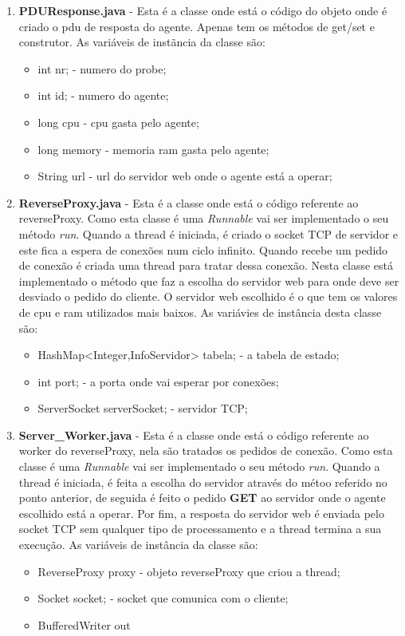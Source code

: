 \documentclass{llncs}
\begin{document}
\begin{enumerate}
				\bigskip
				\item \textbf{PDUResponse.java} - Esta é a classe onde está o código do objeto onde é criado o pdu de resposta do agente. Apenas tem os métodos de get/set e construtor. As variáveis de instãncia da classe são:
					\begin{itemize}
						\item{int nr;} - numero do probe;
						\item{int id;} - numero do agente;
						\item{long cpu} - cpu gasta pelo agente; 
						\item{long memory} - memoria ram gasta pelo agente;
						\item{String url} - url do servidor web onde o agente está a operar;
					\end{itemize}

				\bigskip
				\item \textbf{ReverseProxy.java} - Esta é a classe onde está o código referente ao reverseProxy. Como esta classe é uma \textit{Runnable} vai ser implementado o seu método \textit{run}. Quando a thread é iniciada, é criado o socket TCP de servidor e este fica a espera de conexões num ciclo infinito. Quando recebe um pedido de conexão é criada uma thread para tratar dessa conexão. Nesta classe está implementado o método que faz a escolha do servidor web para onde deve ser desviado o pedido do cliente. O servidor web escolhido é o que tem os valores de cpu e ram utilizados mais baixos.
				As variávies de instância desta classe são:
					\begin{itemize}
						\item{HashMap<Integer,InfoServidor> tabela;} - a tabela de estado;
						\item{int port;} - a porta onde vai esperar por conexões;
						\item{ServerSocket serverSocket;} - servidor TCP;
					\end{itemize}

				\bigskip
				\item \textbf{Server\_Worker.java} - Esta é a classe onde está o código referente ao worker do reverseProxy, nela são tratados os pedidos de conexão. Como esta classe é uma \textit{Runnable} vai ser implementado o seu método \textit{run}. Quando a thread é iniciada, é feita a escolha do servidor através do métoo referido no ponto anterior, de seguida é feito o pedido \textbf{GET} ao servidor onde o agente escolhido está a operar. Por fim, a resposta do servidor web é enviada pelo socket TCP sem qualquer tipo de processamento e a thread termina a sua execução. As variáveis de instância da classe são:
					\begin{itemize}
						\item{ReverseProxy proxy} - objeto reverseProxy que criou a thread;
						\item{Socket socket;} - socket que comunica com o cliente;
						\item{BufferedWriter out}
					\end{itemize}


\end{enumerate}
\end{document}
